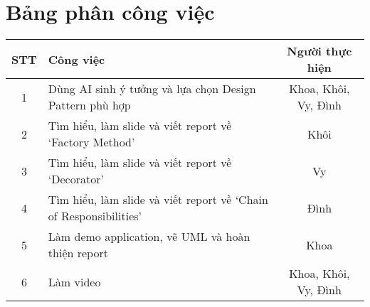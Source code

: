\section{Bảng phân công việc}
\begin{center}
  \renewcommand{\arraystretch}{1.5}
  \begin{tabular}{|c|p{}|c|}
    \hline
    \textbf{STT} & \textbf{Công việc}                                                & \textbf{Người thực hiện} \\\hline
    1            & Dùng AI sinh ý tưởng và lựa chọn Design Pattern phù hợp           & Khoa, Khôi, Vy, Đình     \\\hline
    2            & Tìm hiểu, làm slide và viết report về `Factory Method'            & Khôi                     \\\hline
    3            & Tìm hiểu, làm slide và viết report về `Decorator'                 & Vy                       \\\hline
    4            & Tìm hiểu, làm slide và viết report về `Chain of Responsibilities' & Đình                     \\\hline
    5            & Làm demo application, vẽ UML và hoàn thiện report                 & Khoa                     \\\hline
    6            & Làm video                                                         & Khoa, Khôi, Vy, Đình     \\\hline
  \end{tabular}
\end{center}
